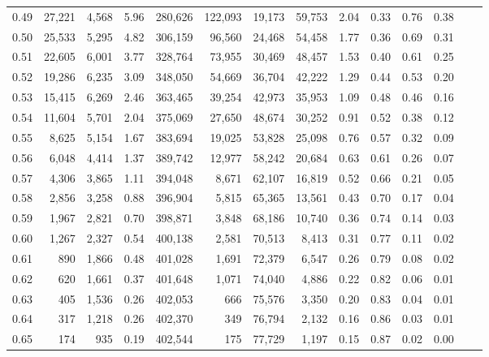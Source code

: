 \begin{tabular}{rrrrrrrrrrrrrr}
0.49 &  27,221 &  4,568 &     5.96 &  280,626 &  122,093 &  19,173 &  59,753 &  2.04 &  0.33 &  0.76 &      0.38 \\
0.50 &  25,533 &  5,295 &     4.82 &  306,159 &   96,560 &  24,468 &  54,458 &  1.77 &  0.36 &  0.69 &      0.31 \\
0.51 &  22,605 &  6,001 &     3.77 &  328,764 &   73,955 &  30,469 &  48,457 &  1.53 &  0.40 &  0.61 &      0.25 \\
0.52 &  19,286 &  6,235 &     3.09 &  348,050 &   54,669 &  36,704 &  42,222 &  1.29 &  0.44 &  0.53 &      0.20 \\
0.53 &  15,415 &  6,269 &     2.46 &  363,465 &   39,254 &  42,973 &  35,953 &  1.09 &  0.48 &  0.46 &      0.16 \\
0.54 &  11,604 &  5,701 &     2.04 &  375,069 &   27,650 &  48,674 &  30,252 &  0.91 &  0.52 &  0.38 &      0.12 \\
0.55 &   8,625 &  5,154 &     1.67 &  383,694 &   19,025 &  53,828 &  25,098 &  0.76 &  0.57 &  0.32 &      0.09 \\
0.56 &   6,048 &  4,414 &     1.37 &  389,742 &   12,977 &  58,242 &  20,684 &  0.63 &  0.61 &  0.26 &      0.07 \\
0.57 &   4,306 &  3,865 &     1.11 &  394,048 &    8,671 &  62,107 &  16,819 &  0.52 &  0.66 &  0.21 &      0.05 \\
0.58 &   2,856 &  3,258 &     0.88 &  396,904 &    5,815 &  65,365 &  13,561 &  0.43 &  0.70 &  0.17 &      0.04 \\
0.59 &   1,967 &  2,821 &     0.70 &  398,871 &    3,848 &  68,186 &  10,740 &  0.36 &  0.74 &  0.14 &      0.03 \\
0.60 &   1,267 &  2,327 &     0.54 &  400,138 &    2,581 &  70,513 &   8,413 &  0.31 &  0.77 &  0.11 &      0.02 \\
0.61 &     890 &  1,866 &     0.48 &  401,028 &    1,691 &  72,379 &   6,547 &  0.26 &  0.79 &  0.08 &      0.02 \\
0.62 &     620 &  1,661 &     0.37 &  401,648 &    1,071 &  74,040 &   4,886 &  0.22 &  0.82 &  0.06 &      0.01 \\
0.63 &     405 &  1,536 &     0.26 &  402,053 &      666 &  75,576 &   3,350 &  0.20 &  0.83 &  0.04 &      0.01 \\
0.64 &     317 &  1,218 &     0.26 &  402,370 &      349 &  76,794 &   2,132 &  0.16 &  0.86 &  0.03 &      0.01 \\
0.65 &     174 &    935 &     0.19 &  402,544 &      175 &  77,729 &   1,197 &  0.15 &  0.87 &  0.02 &      0.00 \\

\end{tabular}
